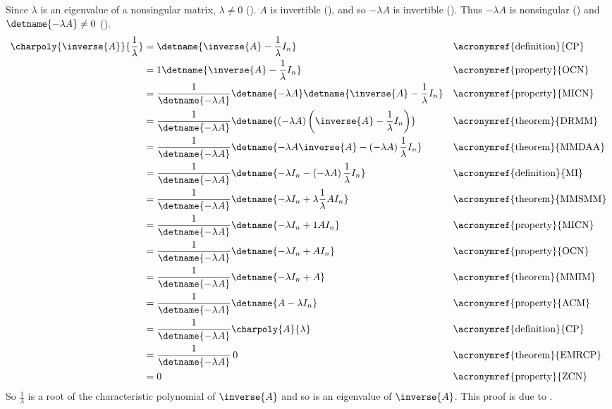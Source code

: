 Since $\lambda$ is an eigenvalue of a nonsingular matrix, $\lambda\neq 0$ ().  $A$ is invertible (), and so $-\lambda A$ is invertible (). Thus $-\lambda A$ is nonsingular () and $\detname{-\lambda A}\neq 0$ ().   
%
\begin{align*}
\charpoly{\inverse{A}}{\frac{1}{\lambda}}
%
&=\detname{\inverse{A}-\frac{1}{\lambda}I_n}
&&\text{\acronymref{definition}{CP}}\\
%
&=1\detname{\inverse{A}-\frac{1}{\lambda}I_n}
&&\text{\acronymref{property}{OCN}}\\
%
&=\frac{1}{\detname{-\lambda A}}
\detname{-\lambda A}\detname{\inverse{A}-\frac{1}{\lambda}I_n}
&&\text{\acronymref{property}{MICN}}\\
%
&=\frac{1}{\detname{-\lambda A}}
\detname{\left(-\lambda A\right)\left(\inverse{A}-\frac{1}{\lambda}I_n\right)}
&&\text{\acronymref{theorem}{DRMM}}\\
%
&=\frac{1}{\detname{-\lambda A}}
\detname{-\lambda A\inverse{A}-\left(-\lambda A\right)\frac{1}{\lambda}I_n}
&&\text{\acronymref{theorem}{MMDAA}}\\
%
&=\frac{1}{\detname{-\lambda A}}
\detname{-\lambda I_n-\left(-\lambda A\right)\frac{1}{\lambda}I_n}
&&\text{\acronymref{definition}{MI}}\\
%
&=\frac{1}{\detname{-\lambda A}}
\detname{-\lambda I_n+\lambda\frac{1}{\lambda}AI_n}
&&\text{\acronymref{theorem}{MMSMM}}\\
%
&=\frac{1}{\detname{-\lambda A}}
\detname{-\lambda I_n+1AI_n}
&&\text{\acronymref{property}{MICN}}\\
%
&=\frac{1}{\detname{-\lambda A}}
\detname{-\lambda I_n+AI_n}
&&\text{\acronymref{property}{OCN}}\\
%
&=\frac{1}{\detname{-\lambda A}}
\detname{-\lambda I_n+A}
&&\text{\acronymref{theorem}{MMIM}}\\
%
&=\frac{1}{\detname{-\lambda A}}
\detname{A-\lambda I_n}
&&\text{\acronymref{property}{ACM}}\\
%
&=\frac{1}{\detname{-\lambda A}}
\charpoly{A}{\lambda}&&\text{\acronymref{definition}{CP}}\\
%
&=\frac{1}{\detname{-\lambda A}}\,0&&\text{\acronymref{theorem}{EMRCP}}\\
%
&=0&&\text{\acronymref{property}{ZCN}}
%
\end{align*}
%
So $\frac{1}{\lambda}$ is a root of the characteristic polynomial of $\inverse{A}$ and so is an eigenvalue of $\inverse{A}$.  This proof is due to \sarabucht.